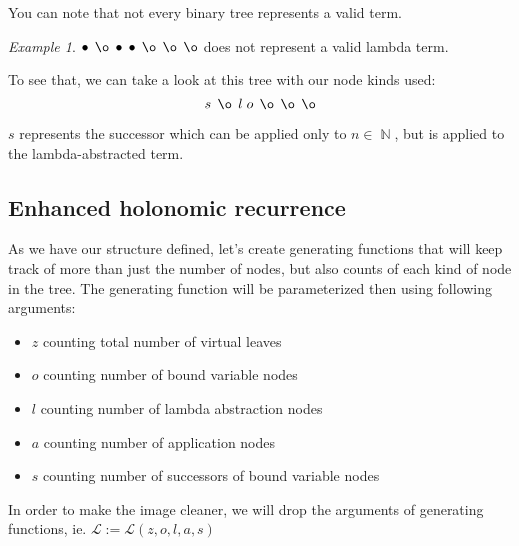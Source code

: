 \documentclass[final]{article}
\theoremstyle{definition}
\theoremstyle{remark}
\newtheorem{example}{Example}[subsection]
\newcommand{\gf}[1]{\ensuremath{\mathcal{#1}}}
\DeclareMathOperator{\N}{\mathbb{N}}
\DeclareMathOperator{\n}{\bullet}
\DeclareMathOperator{\no}{\o}
\begin{document}
You can note that not every binary tree represents a valid term.

\begin{example}
    \(\n\; \no\; \n\; \n\; \no\; \no\; \no\) does not represent a valid lambda term.
\end{example}

To see that, we can take a look at this tree with our node kinds used:
    \[s\; \no\; l\; o\; \no\; \no\; \no\]

\(s\) represents the successor which can be applied only to \(n \in \N\), but is applied to the lambda-abstracted term.

\subsection{Enhanced holonomic recurrence}%
\label{sub:enhanced_holonomic_reccurence}

As we have our structure defined, let's create generating functions that will keep track of more than just the number of nodes, but also counts of each kind of node in the tree. The generating function will be parameterized then using following arguments:
\begin{itemize}
    \item \(z\) counting total number of virtual leaves
    \item \(o\) counting number of bound variable nodes
    \item \(l\) counting number of lambda abstraction nodes
    \item \(a\) counting number of application nodes
    \item \(s\) counting number of successors of bound variable nodes
\end{itemize}

In order to make the image cleaner, we will drop the arguments of generating functions, ie. \(\gf{L} := \gf{L}(z, o, l, a, s)\)
\end{document}
